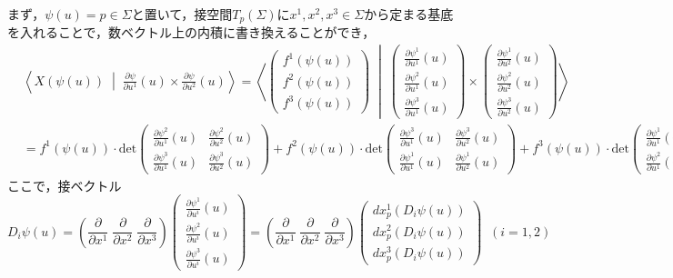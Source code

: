 \documentclass[uplatex, dvipdfmx]{jsreport}
\begin{document}
まず，$\psi(u)=p\in\Sigma$と置いて，接空間$T_p(\Sigma)$に$x^1,x^2,x^3\in\Sigma$から定まる基底を入れることで，数ベクトル上の内積に書き換えることができ，
\begin{align*}
    &\left\langle X(\psi(u))\;\middle|\; \frac{\partial \psi}{\partial u^1}(u)\times\frac{\partial \psi}{\partial u^2}(u) \right\rangle
    = \left\langle \begin{pmatrix}f^1(\psi(u))\\f^2(\psi(u))\\f^3(\psi(u))\end{pmatrix}\;\middle|\; \begin{pmatrix}\frac{\partial\psi^1}{\partial u^1}(u)\\\frac{\partial\psi^2}{\partial u^1}(u)\\\frac{\partial\psi^3}{\partial u^1}(u)\end{pmatrix}\times\begin{pmatrix}\frac{\partial\psi^1}{\partial u^2}(u)\\\frac{\partial\psi^2}{\partial u^2}(u)\\\frac{\partial\psi^3}{\partial u^2}(u)\end{pmatrix} \right\rangle \\
    &= f^1(\psi(u))\cdot\mathrm{det}\begin{pmatrix}\frac{\partial\psi^2}{\partial u^1}(u)&\frac{\partial\psi^2}{\partial u^2}(u)\\\frac{\partial\psi^3}{\partial u^1}(u)&\frac{\partial\psi^3}{\partial u^2}(u)\end{pmatrix} + f^2(\psi(u))\cdot\mathrm{det}\begin{pmatrix}\frac{\partial\psi^3}{\partial u^1}(u)&\frac{\partial\psi^3}{\partial u^2}(u)\\\frac{\partial\psi^1}{\partial u^1}(u)&\frac{\partial\psi^1}{\partial u^2}(u)\end{pmatrix} + f^3(\psi(u))\cdot\mathrm{det}\begin{pmatrix}\frac{\partial\psi^1}{\partial u^1}(u)&\frac{\partial\psi^1}{\partial u^2}(u)\\\frac{\partial\psi^2}{\partial u^1}(u)&\frac{\partial\psi^2}{\partial u^2}(u)\end{pmatrix}
\end{align*}
ここで，接ベクトル
\[ D_i\psi(u)=\left( \frac{\partial}{\partial x^1}\;\frac{\partial}{\partial x^2}\;\frac{\partial}{\partial x^3} \right)\begin{pmatrix}\frac{\partial\psi^1}{\partial u^i}(u)\\\frac{\partial\psi^2}{\partial u^i}(u)\\\frac{\partial\psi^3}{\partial u^i}(u)\end{pmatrix}=\left( \frac{\partial}{\partial x^1}\;\frac{\partial}{\partial x^2}\;\frac{\partial}{\partial x^3} \right)\begin{pmatrix}dx^1_p(D_i\psi(u))\\dx^2_p(D_i\psi(u))\\dx^3_p(D_i\psi(u))\end{pmatrix}\;\;(i=1,2)\]
\end{document}
